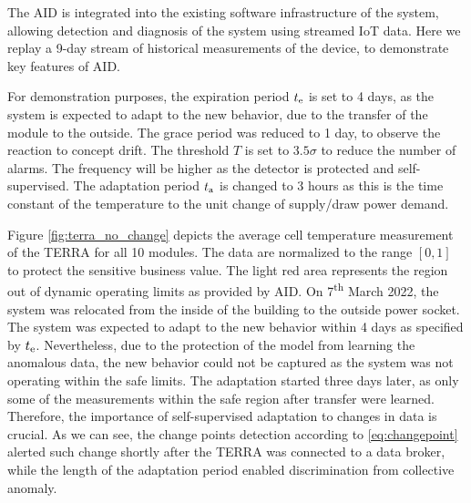The AID is integrated into the existing software infrastructure of the system, allowing detection and diagnosis of the system using streamed IoT data. Here we replay a 9-day stream of historical measurements of the device, to demonstrate key features of AID.

For demonstration purposes, the expiration period $t _{\text{e}}$ is set to 4 days, as the system is expected to adapt to the new behavior, due to the transfer of the module to the outside. The grace period was reduced to 1 day, to observe the reaction to concept drift. The threshold $T$ is set to $3.5 \sigma$ to reduce the number of alarms. The frequency will be higher as the detector is protected and self-supervised. The adaptation period $t _{\text{a}}$ is changed to 3 hours as this is the time constant of the temperature to the unit change of supply/draw power demand.

Figure \ref{fig:terra_no_change} depicts the average cell temperature measurement of the TERRA for all 10 modules. The data are normalized to the range $[0, 1]$ to protect the sensitive business value. The light red area represents the region out of dynamic operating limits as provided by AID. On 7\textsuperscript{th} March 2022, the system was relocated from the inside of the building to the outside power socket. The system was expected to adapt to the new behavior within 4 days as specified by $t _{\text{e}}$. Nevertheless, due to the protection of the model from learning the anomalous data, the new behavior could not be captured as the system was not operating within the safe limits. The adaptation started three days later, as only some of the measurements within the safe region after transfer were learned. Therefore, the importance of self-supervised adaptation to changes in data is crucial. As we can see, the change points detection according to \eqref{eq:changepoint} alerted such change shortly after the TERRA was connected to a data broker, while the length of the adaptation period enabled discrimination from collective anomaly.

